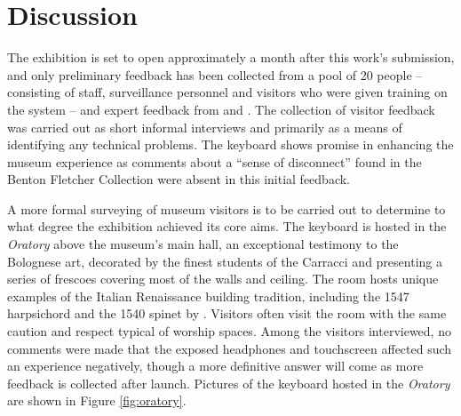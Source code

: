 \section{Discussion}\label{context}

The exhibition is set to open approximately a month after this work's submission, and only preliminary feedback has been collected from a pool of 20 people -- consisting of staff, surveillance personnel and visitors who were given training on the system -- and expert feedback from  and .
The collection of visitor feedback was carried out as short informal interviews and primarily as a means of identifying any technical problems.
The keyboard shows promise in enhancing the museum experience as comments about a ``sense of disconnect'' found in the Benton Fletcher Collection \cite{McAlpine2014} were absent in this initial feedback.


A more formal surveying of museum visitors is to be carried out to determine to what degree the exhibition achieved its core aims.
The keyboard is hosted in the \emph{Oratory} above the museum's main hall, an exceptional testimony to the Bolognese art, decorated by the finest students of the Carracci and presenting a series of frescoes covering most of the walls and ceiling. The room hosts unique examples of the Italian Renaissance building tradition, including the 1547 harpsichord and the 1540 spinet by . Visitors often visit the room with the same caution and respect typical of worship spaces. Among the visitors interviewed, no comments were made that the exposed headphones and touchscreen affected such an experience negatively, though a more definitive answer will come as more feedback is collected after launch. Pictures of the keyboard hosted in the \emph{Oratory} are shown in Figure \ref{fig:oratory}.

